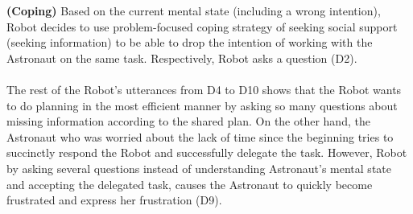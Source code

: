 \noindent\textbf{(Coping)} Based on the current mental state (including a
wrong intention), Robot decides to use problem-focused coping strategy of
seeking social support (seeking information) to be able to drop the intention of
working with the Astronaut on the same task. Respectively, Robot asks a question
(D2).\\

\noindent{}\\

The rest of the Robot's utterances from D4 to D10 shows that the Robot wants to
do planning in the most efficient manner by asking so many questions about
missing information according to the shared plan. On the other hand, the
Astronaut who was worried about the lack of time since the beginning tries to
succinctly respond the Robot and successfully delegate the task. However, Robot
by asking several questions instead of understanding Astronaut's mental state
and accepting the delegated task, causes the Astronaut to quickly become
frustrated and express her frustration (D9).\\

\noindent{}\\

